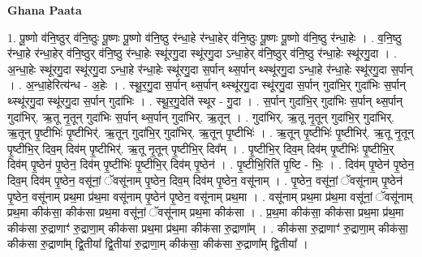 \documentclass[17pt]{extarticle}
\begin{document}
\textbf{Ghana Paata } \newline

1. पू॒ष्णो व॑नि॒ष्ठुर् व॑नि॒ष्ठुः पू॒ष्णः पू॒ष्णो व॑नि॒ष्ठु र॑न्धा॒हे र॑न्धा॒हेर् व॑नि॒ष्ठुः पू॒ष्णः पू॒ष्णो व॑नि॒ष्ठु र॑न्धा॒हेः । . व॒नि॒ष्ठु र॑न्धा॒हे र॑न्धा॒हेर् व॑नि॒ष्ठुर् व॑नि॒ष्ठु र॑न्धा॒हेः स्थू॑रगु॒दा स्थू॑रगु॒दा ऽन्धा॒हेर् व॑नि॒ष्ठुर् व॑नि॒ष्ठु र॑न्धा॒हेः स्थू॑रगु॒दा । . अ॒न्धा॒हेः स्थू॑रगु॒दा स्थू॑रगु॒दा ऽन्धा॒हे र॑न्धा॒हेः स्थू॑रगु॒दा स॒र्पान् थ्स॒र्पान् थ्स्थू॑रगु॒दा ऽन्धा॒हे र॑न्धा॒हेः स्थू॑रगु॒दा स॒र्पान् । . अ॒न्धा॒हेरित्य॑न्ध - अ॒हेः । . स्थू॒र॒गु॒दा स॒र्पान् थ्स॒र्पान् थ्स्थू॑रगु॒दा स्थू॑रगु॒दा स॒र्पान् गुदा॑भि॒र् गुदा॑भिः स॒र्पान् थ्स्थू॑रगु॒दा स्थू॑रगु॒दा स॒र्पान् गुदा॑भिः । . स्थू॒र॒गु॒देति॑ स्थूर - गु॒दा । . स॒र्पान् गुदा॑भि॒र् गुदा॑भिः स॒र्पान् थ्स॒र्पान् गुदा॑भिर्. ऋ॒तू नृ॒तून् गुदा॑भिः स॒र्पान् थ्स॒र्पान् गुदा॑भिर्. ऋ॒तून् । . गुदा॑भिर्. ऋ॒तू नृ॒तून् गुदा॑भि॒र् गुदा॑भिर्. ऋ॒तून् पृ॒ष्टीभिः॑ पृ॒ष्टीभिर्॑. ऋ॒तून् गुदा॑भि॒र् गुदा॑भिर्. ऋ॒तून् पृ॒ष्टीभिः॑ । . ऋ॒तून् पृ॒ष्टीभिः॑ पृ॒ष्टीभिर्॑. ऋ॒तू नृ॒तून् पृ॒ष्टीभि॒र् दिव॒म् दिव॑म् पृ॒ष्टीभिर्॑. ऋ॒तू नृ॒तून् पृ॒ष्टीभि॒र् दिव᳚म् । . पृ॒ष्टीभि॒र् दिव॒म् दिव॑म् पृ॒ष्टीभिः॑ पृ॒ष्टीभि॒र् दिव॑म् पृ॒ष्ठेन॑ पृ॒ष्ठेन॒ दिव॑म् पृ॒ष्टीभिः॑ पृ॒ष्टीभि॒र् दिव॑म् पृ॒ष्ठेन॑ । . पृ॒ष्टीभि॒रिति॑ पृ॒ष्टि - भिः॒ । . दिव॑म् पृ॒ष्ठेन॑ पृ॒ष्ठेन॒ दिव॒म् दिव॑म् पृ॒ष्ठेन॒ वसू॑नां॒ ॅवसू॑नाम् पृ॒ष्ठेन॒ दिव॒म् दिव॑म् पृ॒ष्ठेन॒ वसू॑नाम् । . पृ॒ष्ठेन॒ वसू॑नां॒ ॅवसू॑नाम् पृ॒ष्ठेन॑ पृ॒ष्ठेन॒ वसू॑नाम् प्रथ॒मा प्र॑थ॒मा वसू॑नाम् पृ॒ष्ठेन॑ पृ॒ष्ठेन॒ वसू॑नाम् प्रथ॒मा । . वसू॑नाम् प्रथ॒मा प्र॑थ॒मा वसू॑नां॒ ॅवसू॑नाम् प्रथ॒मा कीक॑सा॒ कीक॑सा प्रथ॒मा वसू॑नां॒ ॅवसू॑नाम् प्रथ॒मा कीक॑सा । . प्र॒थ॒मा कीक॑सा॒ कीक॑सा प्रथ॒मा प्र॑थ॒मा कीक॑सा रु॒द्राणाꣳ॑ रु॒द्राणा॒म् कीक॑सा प्रथ॒मा प्र॑थ॒मा कीक॑सा रु॒द्राणा᳚म् । . कीक॑सा रु॒द्राणाꣳ॑ रु॒द्राणा॒म् कीक॑सा॒ कीक॑सा रु॒द्राणा᳚म् द्वि॒तीया᳚ द्वि॒तीया॑ रु॒द्राणा॒म् कीक॑सा॒ कीक॑सा रु॒द्राणा᳚म् द्वि॒तीया᳚ । \newline
\end{document}
